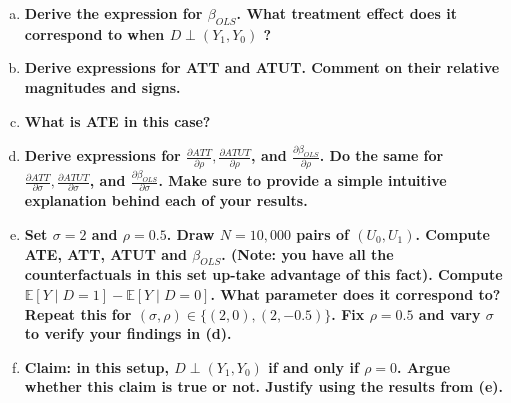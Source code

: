\documentclass{article}
\begin{document}
\begin{enumerate}[(a), wide, labelwidth=!, labelindent=0pt]
    \item \textbf{Derive the expression for $\beta_{O L S}$. What treatment effect does it correspond to when $D \perp\left(Y_{1}, Y_{0}\right)$ ?}
    
    \item \textbf{Derive expressions for ATT and ATUT. Comment on their relative magnitudes and signs.}
    
    \item \textbf{What is ATE in this case?}
    
    \item \textbf{Derive expressions for $\frac{\partial A T T}{\partial \rho}, \frac{\partial A T U T}{\partial \rho}$, and $\frac{\partial \beta_{O L S}}{\partial \rho}$. Do the same for $\frac{\partial A T T}{\partial \sigma}, \frac{\partial A T U T}{\partial \sigma}$, and $\frac{\partial \beta_{O L S}}{\partial \sigma}$. Make sure to provide a simple intuitive explanation behind each of your results.}
    
    \item \textbf{Set $\sigma=2$ and $\rho=0.5$. Draw $N=10,000$ pairs of $\left(U_{0}, U_{1}\right)$. Compute ATE, ATT, ATUT and $\beta_{O L S}$. (Note: you have all the counterfactuals in this set up-take advantage of this fact). Compute $\mathbb{E}[Y \mid D=1]-\mathbb{E}[Y \mid D=0]$. What parameter does it correspond to? Repeat this for $(\sigma, \rho) \in\{(2,0),(2,-0.5)\}$. Fix $\rho=0.5$ and vary $\sigma$ to verify your findings in (d).}
    \item \textbf{Claim: in this setup, $D \perp\left(Y_{1}, Y_{0}\right)$ if and only if $\rho=0$. Argue whether this claim is true or not. Justify using the results from (e).}

\end{enumerate}






\newpage

\end{document}
